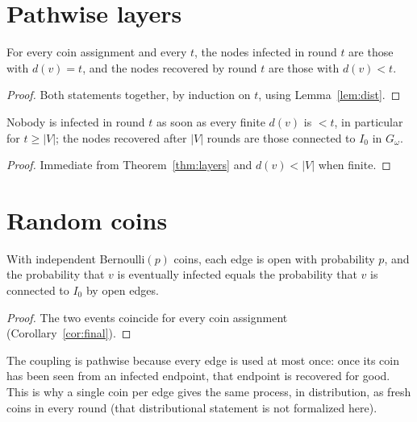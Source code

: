 \section{Pathwise layers}
\begin{theorem}\label{thm:layers}
\leanok{}
For every coin assignment and every $t$, the nodes infected in round $t$ are those with $d(v)=t$,
and the nodes recovered by round $t$ are those with $d(v)<t$.
\end{theorem}
\begin{proof}\leanok
Both statements together, by induction on $t$, using Lemma~\ref{lem:dist}.
\end{proof}
\begin{corollary}\label{cor:final}
\leanok{}
Nobody is infected in round $t$ as soon as every finite $d(v)$ is $<t$, in particular for
$t\ge|V|$; the nodes recovered after $|V|$ rounds are those connected to $I_0$ in $G_\omega$.
\end{corollary}
\begin{proof}\leanok
Immediate from Theorem~\ref{thm:layers} and $d(v)<|V|$ when finite.
\end{proof}

\section{Random coins}
\begin{theorem}\label{thm:perc}
\leanok{}
With independent Bernoulli$(p)$ coins, each edge is open with probability $p$, and the
probability that $v$ is eventually infected equals the probability that $v$ is connected to $I_0$
by open edges.
\end{theorem}
\begin{proof}\leanok
The two events coincide for every coin assignment (Corollary~\ref{cor:final}).
\end{proof}
The coupling is pathwise because every edge is used at most once: once its coin has been seen
from an infected endpoint, that endpoint is recovered for good. This is why a single coin per edge
gives the same process, in distribution, as fresh coins in every round (that distributional
statement is not formalized here).

